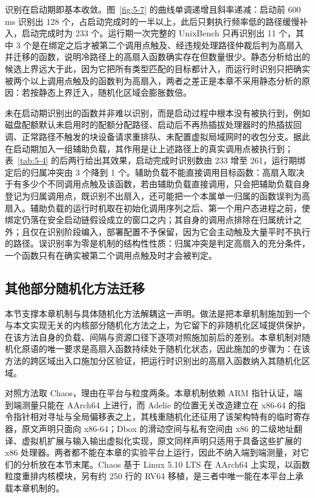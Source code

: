 识别在启动期即基本收敛。图~\ref{fig:5-7} 的曲线单调递增且斜率递减：启动前 600 ms 识别出 128 个，占启动完成时的一半以上，此后只剩执行频率低的路径缓慢补入，启动完成时为 233 个。运行期一次完整的 UnixBench 只再识别出 11 个，其中 3 个是在绑定之后才被第二个调用点触及、经违规处理路径仲裁后判为高扇入并迁移的函数，说明冷路径上的高扇入函数确实存在但数量很少。静态分析给出的候选上界远大于此，因为它把所有类型匹配的目标都计入，而运行时识别只把确实被两个以上调用点触及的函数判为高扇入，两者之差正是本章不采用静态分析的原因：若按静态上界迁入，随机化区域会膨胀数倍。

未在启动期识别出的函数并非难以识别，而是启动过程中根本没有被执行到，例如磁盘配额默认未启用时的配额分配路径、启动后不再热插拔处理器时的热插拔回调、正常路径不触发的块设备请求重排队、未配置虚拟局域网时的收包分支。据此在启动期加入一组辅助负载，其作用是让上述路径上的真实调用点被执行到；表~\ref{tab:5-4} 的后两行给出其效果，启动完成时识别数由 233 增至 261，运行期绑定后的归属冲突由 3 个降到 1 个。辅助负载不能直接调用目标函数：高扇入取决于有多少个不同调用点触及该函数，若由辅助负载直接调用，只会把辅助负载自身登记为归属调用点，既识别不出扇入，还可能把一个本属单一归属的函数误判为高扇入。辅助负载的运行时机取在初始化调用序列之后、第一个用户态进程之前，使绑定仍落在安全启动链假设成立的窗口之内；其自身的调用点排除在归属统计之外；且仅在识别阶段编入，部署配置不予保留，因为它会主动触及大量平时不执行的路径。误识别率为零是机制的结构性性质：归属冲突是判定高扇入的充分条件，一个函数只有在确实被第二个调用点触及时才会被判定。

\subsection{其他部分随机化方法迁移}

本节支撑本章机制与具体随机化方法解耦这一声明。做法是把本章机制施加到一个与本文实现无关的内核部分随机化方法之上，为它留下的非随机化区域提供保护，在该方法自身的负载、间隔与资源口径下逐项对照施加前后的差别。本章机制对随机化原语的唯一要求是高扇入函数持续处于随机化状态，因此施加的步骤为：在该方法的跨区域出入口施加分区验证，把运行时识别出的高扇入函数纳入其随机化区域。

对照方法取 Chaos\citep{chang2024chaos}，理由在平台与粒度两条。本章机制依赖 ARM 指针认证，端到端测量只能在 AArch64 上进行，而 Adelie\citep{nikolaev2022adelie} 的位置无关改造建立在 x86-64 的指令指针相对寻址与全局偏移表之上，其栈重随机化还征用了该架构特有的临时寄存器，原文声明只面向 x86-64；Dbox\citep{li2024dbox} 的滑动空间与私有空间由 x86 的二级地址翻译、虚拟机扩展与输入输出虚拟化实现，原文同样声明只适用于具备这些扩展的 x86 处理器。两者都不能在本章的实验平台上运行，因此不纳入端到端测量，对它们的分析放在本节末尾。Chaos 基于 Linux 5.10 LTS 在 AArch64 上实现，以函数粒度重排内核模块，另有约 250 行的 RV64 移植，是三者中唯一能在本平台上承载本章机制的。

